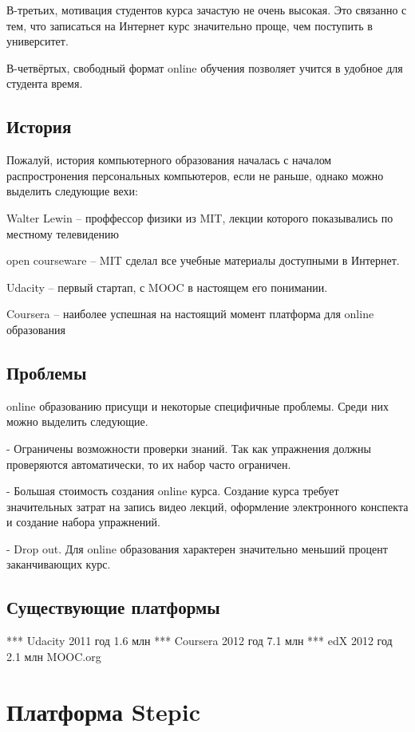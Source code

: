 \documentclass{matmex-diploma-custom}
\begin{document}
В-третьих, мотивация студентов курса зачастую не очень высокая. Это
связанно с тем, что записаться на Интернет курс значительно проще, чем
поступить в университет.

В-четвёртых, свободный формат online обучения позволяет учится в
удобное для студента время.

\subsection*{История}
Пожалуй, история компьютерного образования началась с началом
распростронения персональных компьютеров, если не раньше, однако можно
выделить следующие вехи:

Walter Lewin -- проффессор физики из MIT, лекции которого показывались
по местному телевидению

open courseware -- MIT сделал все учебные материалы доступными в Интернет.

Udacity -- первый стартап, с MOOC в настоящем его понимании.

Coursera -- наиболее успешная на настоящий момент платформа для online
образования

\subsection*{Проблемы}
online образованию присущи и некоторые специфичные проблемы. Среди них
можно выделить следующие.

- Ограничены возможности проверки знаний.
  Так как упражнения должны проверяются автоматически, то их набор часто
  ограничен.

- Большая стоимость создания online курса.  Создание курса требует
  значительных затрат на запись видео лекций, оформление
  электронного конспекта и создание набора упражнений.

- Drop out. Для online образования характерен значительно меньший
  процент заканчивающих курс.

\subsection*{Существующие платформы}
*** Udacity
   2011 год
   1.6 млн
*** Coursera
   2012 год
   7.1 млн
*** edX
   2012 год
   2.1 млн
   MOOC.org

\section{Платформа Stepic}
\end{document}
